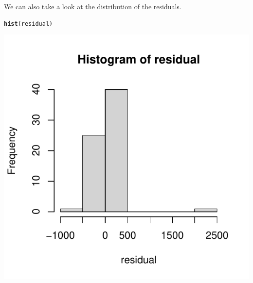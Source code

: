 \documentclass{article}\usepackage[]{graphicx}\usepackage[]{color}
\makeatletter
\def\maxwidth{ %
  \ifdim\Gin@nat@width>\linewidth
    \linewidth
  \else
    \Gin@nat@width
  \fi
}
\newcommand{\hlstd}[1]{\textcolor[rgb]{0.345,0.345,0.345}{#1}}%
\newcommand{\hlkwd}[1]{\textcolor[rgb]{0.737,0.353,0.396}{\textbf{#1}}}%
\newenvironment{kframe}{%
 \def\at@end@of@kframe{}%
 \ifinner\ifhmode%
  \def\at@end@of@kframe{\end{minipage}}%
  \begin{minipage}{\columnwidth}%
 \fi\fi%
 \def\FrameCommand##1{\hskip\@totalleftmargin \hskip-\fboxsep
 \colorbox{shadecolor}{##1}\hskip-\fboxsep
     \hskip-\linewidth \hskip-\@totalleftmargin \hskip\columnwidth}%
 \MakeFramed {\advance\hsize-\width
   \@totalleftmargin\z@ \linewidth\hsize
   \@setminipage}}%
 {\par\unskip\endMakeFramed%
 \at@end@of@kframe}
\newenvironment{knitrout}{}{} %
\makeatother
\begin{document}
We can also take a look at the distribution of the residuals.
\begin{knitrout}
\color{fgcolor}\begin{kframe}
\begin{alltt}
\hlkwd{hist}\hlstd{(residual)}
\end{alltt}
\end{kframe}

{\centering \includegraphics[width=\maxwidth]{figure/unnamed-chunk-22-1} 

}


\end{knitrout}
\end{document}
